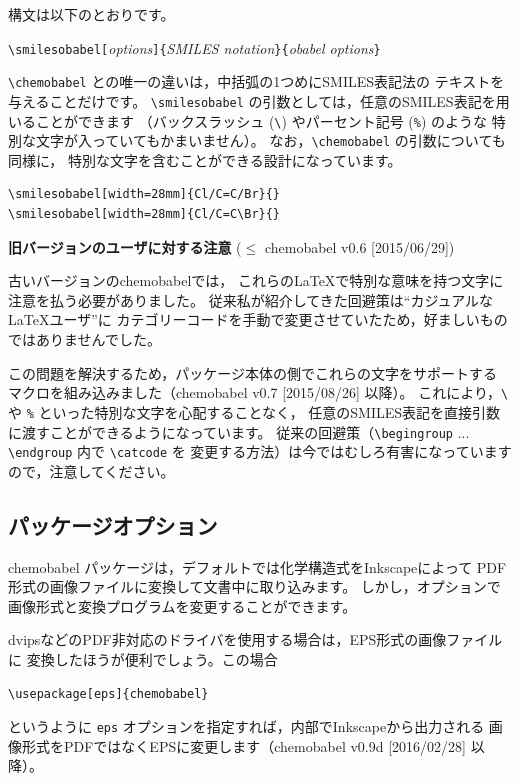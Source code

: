 \documentclass[12pt]{ltjsarticle}
\begin{document}
構文は以下のとおりです。
\begin{center}
\verb|\smilesobabel[|\textit{options}\verb|]{|\textit{SMILES notation}\verb|}{|\textit{obabel options}\verb|}|
\end{center}
\verb|\chemobabel| との唯一の違いは，中括弧の1つめにSMILES表記法の
テキストを与えることだけです。
\verb|\smilesobabel| の引数としては，任意のSMILES表記を用いることができます
（バックスラッシュ (\verb|\|) やパーセント記号 (\verb|%|) のような
特別な文字が入っていてもかまいません）。
なお，\verb|\chemobabel| の引数についても同様に，
特別な文字を含むことができる設計になっています。
\begin{verbatim}
\smilesobabel[width=28mm]{Cl/C=C/Br}{}
\smilesobabel[width=28mm]{Cl/C=C\Br}{}
\end{verbatim}
\begin{figure}[h]
  \centering
   \quad
\end{figure}


\noindent \textbf{旧バージョンのユーザに対する注意} ($\le$ \textsf{chemobabel} v0.6 [2015/06/29])

古いバージョンの\textsf{chemobabel}では，
これらの\LaTeX で特別な意味を持つ文字に注意を払う必要がありました。
従来私が紹介してきた回避策は“カジュアルな \LaTeX ユーザ”に
カテゴリーコードを手動で変更させていたため，好ましいものではありませんでした。

この問題を解決するため，パッケージ本体の側でこれらの文字をサポートする
マクロを組み込みました（\textsf{chemobabel} v0.7 [2015/08/26] 以降）。
これにより，\verb|\| や \verb|%| といった特別な文字を心配することなく，
任意のSMILES表記を直接引数に渡すことができるようになっています。
従来の回避策（\verb|\begingroup| ... \verb|\endgroup| 内で \verb|\catcode| を
変更する方法）は今ではむしろ有害になっていますので，注意してください。

\clearpage

\subsection{パッケージオプション}

\textsf{chemobabel} パッケージは，デフォルトでは化学構造式をInkscapeによって
PDF形式の画像ファイルに変換して文書中に取り込みます。
しかし，オプションで画像形式と変換プログラムを変更することができます。

dvipsなどのPDF非対応のドライバを使用する場合は，EPS形式の画像ファイルに
変換したほうが便利でしょう。この場合
\begin{verbatim}
\usepackage[eps]{chemobabel}
\end{verbatim}
というように \verb|eps| オプションを指定すれば，内部でInkscapeから出力される
画像形式をPDFではなくEPSに変更します（\textsf{chemobabel} v0.9d [2016/02/28] 以降）。
\end{document}
